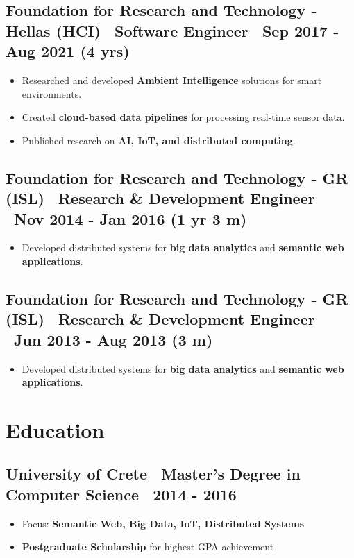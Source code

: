 \documentclass[a4paper,10pt]{article}
\begin{document}
\subsection*{Foundation for Research and Technology - Hellas (HCI) \textbar\ Software Engineer \textbar\ Sep 2017 - Aug 2021 (4 yrs)}
\begin{itemize}[left=0pt]
    \item Researched and developed \textbf{Ambient Intelligence} solutions for smart environments.
    \item Created \textbf{cloud-based data pipelines} for processing real-time sensor data.
    \item Published research on \textbf{AI, IoT, and distributed computing}.
\end{itemize}

\subsection*{Foundation for Research and Technology - GR (ISL) \textbar\ Research \& Development Engineer \textbar\ Nov 2014 - Jan 2016 (1 yr 3 m)}
\begin{itemize}[left=0pt]
    \item Developed distributed systems for \textbf{big data analytics} and \textbf{semantic web applications}.
\end{itemize}

\subsection*{Foundation for Research and Technology - GR (ISL) \textbar\ Research \& Development Engineer \textbar\ Jun 2013 - Aug 2013 (3 m)}
\begin{itemize}[left=0pt]
    \item Developed distributed systems for \textbf{big data analytics} and \textbf{semantic web applications}.
\end{itemize}


\vspace{2pt}

\section*{ Education}

\subsection*{University of Crete \textbar\ Master's Degree in Computer Science \textbar\ 2014 - 2016}
\begin{itemize}[left=0pt]
    \item Focus: \textbf{Semantic Web, Big Data, IoT, Distributed Systems}
    \item \textbf{Postgraduate Scholarship} for highest GPA achievement
\end{itemize}
\end{document}
